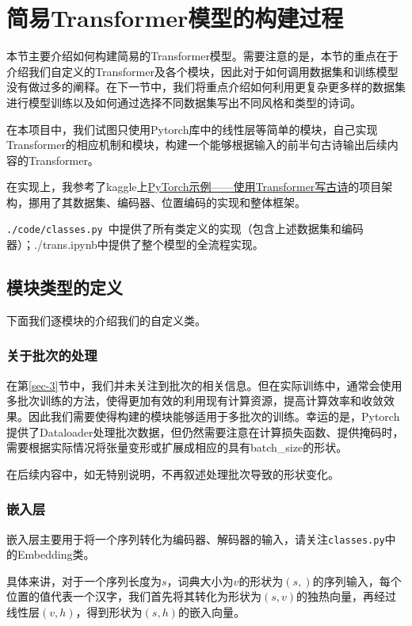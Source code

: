 \section{简易Transformer模型的构建过程}\label{sec-5}

本节主要介绍如何构建简易的Transformer模型。需要注意的是，本节的重点在于介绍我们自定义的Transformer及各个模块，因此对于如何调用数据集和训练模型没有做过多的阐释。在下一节中，我们将重点介绍如何利用更复杂更多样的数据集进行模型训练以及如何通过选择不同数据集写出不同风格和类型的诗词。

在本项目中，我们试图只使用Pytorch库中的线性层等简单的模块，自己实现Transformer的相应机制和模块，构建一个能够根据输入的前半句古诗输出后续内容的Transformer。

在实现上，我参考了kaggle上\href{https://www.kaggle.com/code/alionsss/pytorch-transformer-x/notebook}{PyTorch示例——使用Transformer写古诗}的项目架构，挪用了其数据集、编码器、位置编码的实现和整体框架。

\texttt{./code/classes.py }中提供了所有类定义的实现（包含上述数据集和编码器）；./trans.ipynb中提供了整个模型的全流程实现。

\subsection{模块类型的定义}

下面我们逐模块的介绍我们的自定义类。

\subsubsection{关于批次的处理}

在第\ref{sec-3}节中，我们并未关注到批次的相关信息。但在实际训练中，通常会使用多批次训练的方法，使得更加有效的利用现有计算资源，提高计算效率和收敛效果。因此我们需要使得构建的模块能够适用于多批次的训练。幸运的是，Pytorch提供了Dataloader处理批次数据，但仍然需要注意在计算损失函数、提供掩码时，需要根据实际情况将张量变形或扩展成相应的具有batch\_size的形状。

在后续内容中，如无特别说明，不再叙述处理批次导致的形状变化。

\subsubsection{嵌入层}

嵌入层主要用于将一个序列转化为编码器、解码器的输入，请关注\texttt{classes.py}中的Embedding类。

具体来讲，对于一个序列长度为$s$，词典大小为$v$的形状为$(s,)$的序列输入，每个位置的值代表一个汉字，我们首先将其转化为形状为$(s,v)$的独热向量，再经过线性层$(v,h)$，得到形状为$(s,h)$的嵌入向量。

